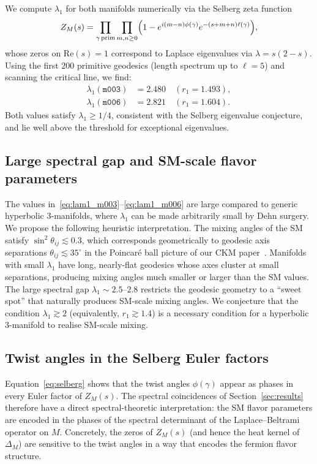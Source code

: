 \documentclass[11pt,a4paper]{article}
\newcommand{\mfld}[1]{\texttt{#1}}
\newcommand{\degr}{^{\circ}}
\begin{document}
We compute $\lambda_1$ for both manifolds numerically via the Selberg zeta
function~\cite{Selberg56}
\begin{equation}
  Z_M(s) = \prod_{\gamma\,\rm prim}\prod_{m,n\geq 0}
  \Bigl(1-e^{i(m-n)\phi(\gamma)}e^{-(s+m+n)\ell(\gamma)}\Bigr),
  \label{eq:selberg}
\end{equation}
whose zeros on $\mathrm{Re}(s)=1$ correspond to Laplace eigenvalues via
$\lambda = s(2-s)$.
Using the first 200 primitive geodesics (length spectrum up to $\ell=5$) and
scanning the critical line, we find:
\begin{align}
  \lambda_1(\mfld{m003}) &= 2.480 \quad (r_1=1.493), \label{eq:lam1_m003}\\
  \lambda_1(\mfld{m006}) &= 2.821 \quad (r_1=1.604). \label{eq:lam1_m006}
\end{align}
Both values satisfy $\lambda_1 \geq 1/4$, consistent with the Selberg eigenvalue
conjecture, and lie well above the threshold for exceptional eigenvalues.

\subsection{Large spectral gap and SM-scale flavor parameters}

The values in~\eqref{eq:lam1_m003}--\eqref{eq:lam1_m006} are large compared
to generic hyperbolic 3-manifolds, where $\lambda_1$ can be made arbitrarily
small by Dehn surgery.
We propose the following heuristic interpretation.
The mixing angles of the SM satisfy
$\sin^2\theta_{ij}\lesssim 0.3$, which corresponds geometrically to
geodesic axis separations $\theta_{ij}\lesssim 35\degr$ in the Poincar\'e
ball picture of our CKM paper~\cite{GentryCKM}.
Manifolds with small $\lambda_1$ have long, nearly-flat geodesics whose
axes cluster at small separations, producing mixing angles much smaller or
larger than the SM values.
The large spectral gap $\lambda_1\sim 2.5$--$2.8$ restricts the geodesic
geometry to a ``sweet spot'' that naturally produces SM-scale mixing angles.
We conjecture that the condition $\lambda_1\gtrsim 2$ (equivalently,
$r_1\gtrsim 1.4$) is a necessary condition for a hyperbolic 3-manifold to
realise SM-scale mixing.

\subsection{Twist angles in the Selberg Euler factors}

Equation~\eqref{eq:selberg} shows that the twist angles $\phi(\gamma)$ appear
as phases in every Euler factor of $Z_M(s)$.
The spectral coincidences of Section~\ref{sec:results} therefore have a direct
spectral-theoretic interpretation: the SM flavor parameters are encoded in the
phases of the spectral determinant of the Laplace--Beltrami operator on $M$.
Concretely, the zeros of $Z_M(s)$ (and hence the heat kernel of $\Delta_M$)
are sensitive to the twist angles in a way that encodes the fermion flavor
structure.
\end{document}

